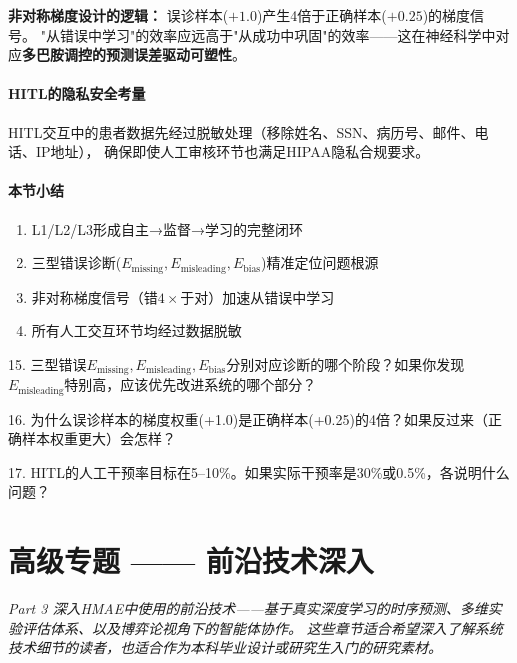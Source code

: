\documentclass[11pt,a4paper]{ctexart}
\begin{document}
\textbf{非对称梯度设计的逻辑：} 误诊样本($+1.0$)产生4倍于正确样本($+0.25$)的梯度信号。
"从错误中学习"的效率应远高于"从成功中巩固"的效率——这在神经科学中对应\textbf{多巴胺调控的预测误差驱动可塑性}。

\subsection{HITL的隐私安全考量}

HITL交互中的患者数据先经过脱敏处理（移除姓名、SSN、病历号、邮件、电话、IP地址），
确保即使人工审核环节也满足HIPAA隐私合规要求。

\subsection{本节小结}

\begin{enumerate}[nosep]
\item L1/L2/L3形成自主→监督→学习的完整闭环
\item 三型错误诊断($E_{\text{missing}}, E_{\text{misleading}}, E_{\text{bias}}$)精准定位问题根源
\item 非对称梯度信号（错$4\times$于对）加速从错误中学习
\item 所有人工交互环节均经过数据脱敏
\end{enumerate}

\begin{exerbox}[思考题 15--17]
15. 三型错误$E_{\text{missing}}, E_{\text{misleading}}, E_{\text{bias}}$分别对应诊断的哪个阶段？如果你发现$E_{\text{misleading}}$特别高，应该优先改进系统的哪个部分？

16. 为什么误诊样本的梯度权重(+1.0)是正确样本(+0.25)的4倍？如果反过来（正确样本权重更大）会怎样？

17. HITL的人工干预率目标在5--10\%。如果实际干预率是30\%或0.5\%，各说明什么问题？
\end{exerbox}

\newpage

\part{高级专题 —— 前沿技术深入}\vspace{18pt}
\vspace{6pt}
\begin{center}
\small
\textit{Part 3 深入HMAE中使用的前沿技术——基于真实深度学习的时序预测、多维实验评估体系、以及博弈论视角下的智能体协作。}
\textit{这些章节适合希望深入了解系统技术细节的读者，也适合作为本科毕业设计或研究生入门的研究素材。}
\end{center}
\vspace{12pt}
\end{document}

